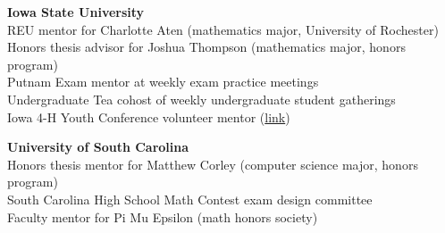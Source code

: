 \documentclass[margin,line]{resume}
\begin{document}
\begin{resume}
    \noindent \textbf{Iowa State University} \\ %
    REU mentor for Charlotte Aten (mathematics major, University of Rochester)\\
    Honors thesis advisor for Joshua Thompson (mathematics major, honors program)\\
    Putnam Exam mentor at weekly exam practice meetings\\
    Undergraduate Tea cohost of weekly undergraduate student gatherings\\
    Iowa 4-H Youth Conference volunteer mentor
    (\href{https://math.iastate.edu/2015/10/28/4-h-dared-to-discover-the-math-of-juggling/}{link})\\[6pt]

    \newpage

    \textbf{University of South Carolina}\\
    Honors thesis mentor for
    Matthew Corley (computer science major, honors program)\\ 
    South Carolina High School Math Contest exam design committee\\
    Faculty mentor for Pi Mu Epsilon (math honors society)


\end{resume}
\end{document}
